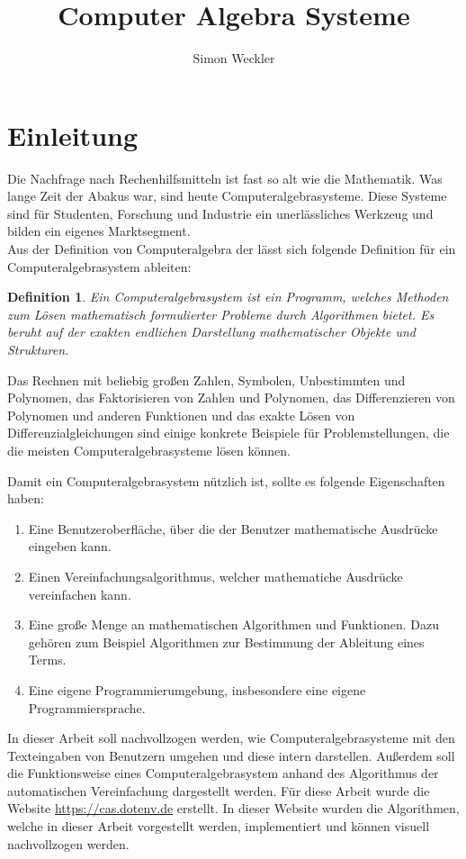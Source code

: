 \documentclass[11pt]{article}
\title{Computer Algebra Systeme}
\author{Simon Weckler}
\newtheorem{defin}{Definition}
\begin{document}
\maketitle
\tableofcontents

\section{Einleitung}

Die Nachfrage nach Rechenhilfsmitteln ist fast so alt wie die Mathematik.
Was lange Zeit der Abakus war, sind heute Computeralgebrasysteme.
Diese Systeme sind für Studenten, Forschung und Industrie ein unerlässliches Werkzeug
und bilden ein eigenes Marktsegment.\\

Aus der Definition von Computeralgebra der \citeauthor{CA} \cite{CA}
lässt sich folgende Definition für ein Computeralgebrasystem ableiten:
\begin{defin}
\label{def:cas}
Ein Computeralgebrasystem ist ein Programm, welches Methoden zum Lösen mathematisch
formulierter Probleme durch Algorithmen bietet. Es beruht auf der exakten
endlichen Darstellung mathematischer Objekte und Strukturen.
\end{defin}
Das Rechnen mit beliebig großen Zahlen, Symbolen, Unbestimmten und Polynomen, 
das Faktorisieren von Zahlen und Polynomen, das Differenzieren von Polynomen und 
anderen Funktionen und das exakte Lösen von Differenzialgleichungen 
sind einige konkrete Beispiele für Problemstellungen, die die meisten Computeralgebrasysteme
lösen können.

Damit ein Computeralgebrasystem nützlich ist, sollte es folgende Eigenschaften haben:
\begin{enumerate}
  \item Eine Benutzeroberfläche, über die der Benutzer mathematische Ausdrücke eingeben kann.
  \item Einen Vereinfachungsalgorithmus, welcher mathematiche Ausdrücke vereinfachen kann.
  \item Eine große Menge an mathematischen Algorithmen und Funktionen. Dazu gehören zum Beispiel
        Algorithmen zur Bestimmung der Ableitung eines Terms.
  \item Eine eigene Programmierumgebung, insbesondere eine eigene Programmiersprache.
\end{enumerate}

In dieser Arbeit soll nachvollzogen werden, wie Computeralgebrasysteme mit den Texteingaben von Benutzern 
umgehen und diese intern darstellen. Außerdem soll die Funktionsweise eines Computeralgebrasystem 
anhand des Algorithmus der automatischen Vereinfachung dargestellt werden.
Für diese Arbeit wurde die Website \url{https://cas.dotenv.de} erstellt.
In dieser Website wurden die Algorithmen, welche in dieser Arbeit vorgestellt werden, implementiert
und können visuell nachvollzogen werden.
\end{document}
